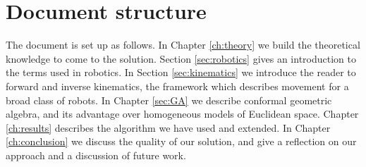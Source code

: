 \section{Document structure}
The document is set up as follows. In Chapter \ref{ch:theory} we build the
theoretical knowledge to come to the solution. Section \ref{sec:robotics}
gives an introduction to the terms used in robotics.  In Section
\ref{sec:kinematics} we introduce the reader to forward and inverse
kinematics, the framework which describes movement for a broad class of
robots.  In Chapter \ref{sec:GA} we describe conformal geometric algebra, and
its advantage over homogeneous models of Euclidean space.  Chapter
\ref{ch:results} describes the algorithm we have used and extended.  In
Chapter \ref{ch:conclusion} we discuss the quality of our solution, and give a
reflection on our approach and a discussion of future work.
